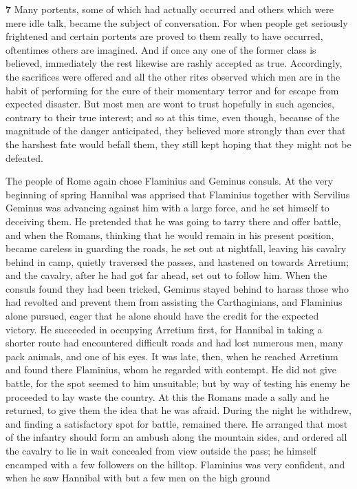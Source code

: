 \textbf{7}
Many portents, some of which had actually occurred and others which were mere idle talk, became the subject of conversation. For when people get seriously frightened and certain portents are proved to them really to have occurred, oftentimes others are imagined. And if once any one of the former class is believed, immediately the rest likewise are rashly accepted as true. Accordingly, the sacrifices were offered and all the other rites observed which men are in the habit of performing for the cure of their momentary terror and for escape from expected disaster. But most men are wont to trust hopefully in such agencies, contrary to their true interest; and so at this time, even though, because of the magnitude of the danger anticipated, they believed more strongly than ever that the harshest fate would befall them, they still kept hoping that they might not be defeated.

The people of Rome again chose Flaminius and Geminus consuls. At the very beginning of spring Hannibal was apprised that Flaminius together with Servilius Geminus was advancing against him with a large force, and he set himself to deceiving them. He pretended that he was going to tarry there and offer battle, and when the Romans, thinking that he would remain in his present position, became careless in guarding the roads, he set out at nightfall, leaving his cavalry behind in camp, quietly traversed the passes, and hastened on towards
Arretium; and the cavalry, after he had got far ahead, set out to follow him. When the consuls found they had been tricked, Geminus stayed behind to harass those who had revolted and prevent them from assisting the Carthaginians, and Flaminius alone pursued, eager that he alone should have the credit for the expected victory. He succeeded in occupying Arretium first, for Hannibal in taking a shorter route had encountered difficult roads and had lost numerous men, many pack animals, and one of his eyes. It was late, then, when he reached Arretium and found there Flaminius, whom he regarded with contempt. He did not give battle, for the spot seemed to him unsuitable; but by way of testing his enemy he proceeded to lay waste the country. At this the Romans made a sally and he returned, to give them the idea that he was afraid. During the night he withdrew, and finding a satisfactory spot for battle, remained there. He arranged that most of the infantry should form an ambush along the mountain sides, and ordered all the cavalry to lie in wait concealed from view outside the pass; he himself encamped with a few followers on the hilltop. Flaminius was very confident, and when he saw Hannibal with but a few men on the high ground

